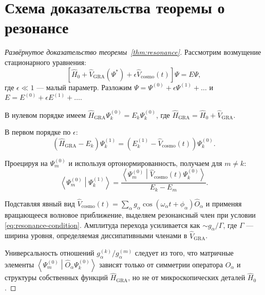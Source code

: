 \documentclass[12pt,a4paper]{article}
\theoremstyle{plain}
\theoremstyle{definition}
\theoremstyle{remark}
\newcommand{\GRA}{\text{GRA}}
\newcommand{\cosmo}{\text{cosmo}}
\newcommand{\inner}[2]{\left\langle #1 \middle| #2 \right\rangle}
\begin{document}
\appendix
\section{Схема доказательства теоремы о резонансе}
\label{app:proof}

\begin{proof}[Развёрнутое доказательство теоремы~\ref{thm:resonance}]
Рассмотрим возмущение стационарного уравнения:
\begin{equation}
\left[ \hat{H}_0 + \hat{V}_{\GRA}(\Psi^*) + \epsilon \hat{V}_{\cosmo}(t) \right] \Psi = E \Psi,
\end{equation}
где $\epsilon \ll 1$ --- малый параметр. Разложим $\Psi = \Psi^{(0)} + \epsilon \Psi^{(1)} + \dots$ и $E = E^{(0)} + \epsilon E^{(1)} + \dots$.

В нулевом порядке имеем $\hat{H}_{\GRA} \Psi_k^{(0)} = E_k \Psi_k^{(0)}$, где $\hat{H}_{\GRA} = \hat{H}_0 + \hat{V}_{\GRA}$.

В первом порядке по $\epsilon$:
\begin{equation}
\left( \hat{H}_{\GRA} - E_k \right) \Psi_k^{(1)} = 
\left( E_k^{(1)} - \hat{V}_{\cosmo}(t) \right) \Psi_k^{(0)}.
\end{equation}

Проецируя на $\Psi_m^{(0)}$ и используя ортонормированность, получаем для $m \neq k$:
\begin{equation}
\inner{\Psi_m^{(0)}}{\Psi_k^{(1)}} = 
\frac{\inner{\Psi_m^{(0)}}{\hat{V}_{\cosmo}(t) \Psi_k^{(0)}}}{E_k - E_m}.
\end{equation}

Подставляя явный вид $\hat{V}_{\cosmo}(t) = \sum_\alpha g_\alpha \cos(\omega_\alpha t + \phi_\alpha) \hat{O}_\alpha$ и применяя вращающееся волновое приближение, выделяем резонансный член при условии \eqref{eq:resonance-condition}. Амплитуда перехода усиливается как $\sim g_\alpha / \Gamma$, где $\Gamma$ --- ширина уровня, определяемая диссипативными членами в $\hat{V}_{\GRA}$.

Универсальность отношений $g_\alpha^{(k)}/g_\alpha^{(m)}$ следует из того, что матричные элементы $\inner{\Psi_m^{(0)}}{\hat{O}_\alpha \Psi_k^{(0)}}$ зависят только от симметрии оператора $\hat{O}_\alpha$ и структуры собственных функций $\hat{H}_{\GRA}$, но не от микроскопических деталей $\hat{H}_0$.
\end{proof}
\end{document}
